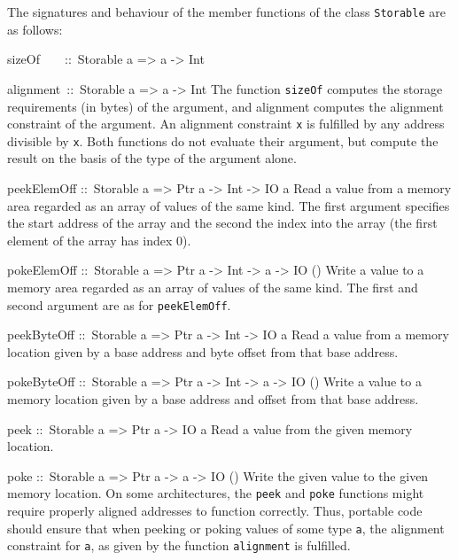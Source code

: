 \documentclass[a4paper,twoside]{article}
\makeatletter
\newcommand{\code}[1]{\texttt{#1}}      %
\newenvironment{codedesc}{%
  \list{}{\labelwidth\z@
    \let\makelabel\codedesclabel}
  }{%
  \endlist
  }
\newcommand*{\codedesclabel}[1]{%
  \hspace{-\leftmargin}
  \parbox[b]{\labelwidth}{\makebox[0pt][l]{\code{#1}}\\}\hfil\relax
  }
\newcommand{\combineitems}{\vspace*{-\itemsep}\vspace*{-\parsep}\vspace*{-1em}}
\makeatother
\begin{document}
The signatures and behaviour of the member functions of the class
\code{Storable} are as follows:
%
\begin{codedesc}
\item[sizeOf~~~~::\ Storable a => a -> Int]
\item[alignment~::\ Storable a => a -> Int]\combineitems The function
  \code{sizeOf} computes the storage requirements (in bytes) of the argument,
  and alignment computes the alignment constraint of the argument.  An
  alignment constraint \code{x} is fulfilled by any address divisible by
  \code{x}. Both functions do not evaluate their argument, but compute the
  result on the basis of the type of the argument alone.

\item[peekElemOff ::\ Storable a => Ptr a -> Int -> IO a] Read a value from a
  memory area regarded as an array of values of the same kind. The first
  argument specifies the start address of the array and the second the index
  into the array (the first element of the array has index 0).
  
\item[pokeElemOff ::\ Storable a => Ptr a -> Int -> a -> IO ()] Write a value
  to a memory area regarded as an array of values of the same kind.  The first
  and second argument are as for \code{peekElemOff}.
  
\item[peekByteOff ::\ Storable a => Ptr a -> Int -> IO a] Read a value from a
  memory location given by a base address and byte offset from that base
  address.
  
\item[pokeByteOff ::\ Storable a => Ptr a -> Int -> a -> IO ()] Write a value
  to a memory location given by a base address and offset from that base
  address.
  
\item[peek ::\ Storable a => Ptr a -> IO a] Read a value from the given memory
  location.
  
\item[poke ::\ Storable a => Ptr a -> a -> IO ()] Write the given value to the
  given memory location.
\end{codedesc}
%
On some architectures, the \code{peek} and \code{poke} functions might require
properly aligned addresses to function correctly.  Thus, portable code should
ensure that when peeking or poking values of some type \code{a}, the alignment
constraint for \code{a}, as given by the function \code{alignment} is
fulfilled.
\end{document}
